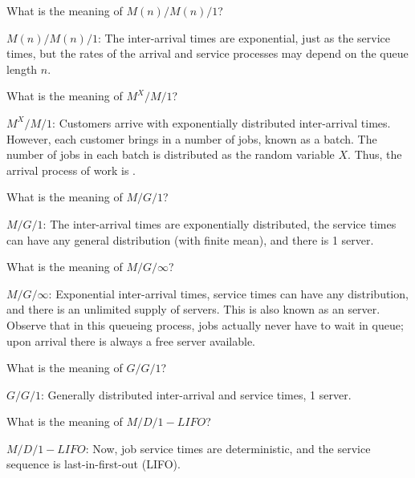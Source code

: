 \begin{exercise}
  What is the meaning of $M(n)/M(n)/1$?
  \begin{solution}
$M(n)/M(n)/1$: The inter-arrival times are exponential, just as
  the service times, but the rates of the arrival and service processes
  may depend on the queue length $n$. 
  \end{solution}
\end{exercise}


\begin{exercise}
  What is the meaning of $M^X/M/1$?
  \begin{solution}
 $M^X/M/1$: Customers arrive with exponentially distributed
  inter-arrival times. However, each customer brings in a number of
  jobs, known as a batch. The number of jobs in each batch is
  distributed as the random variable $X$. Thus, the arrival process of
  work is .
  \end{solution}
\end{exercise}

\begin{exercise}
  What is the meaning of $M/G/1$?
  \begin{solution}
$M/G/1$: The inter-arrival times are exponentially distributed,
  the service times can have any general distribution (with
  finite mean), and there is 1 server.
  \end{solution}
\end{exercise}


\begin{exercise}
  What is the meaning of $M/G/\infty$?
  \begin{solution}
 $M/G/\infty$: Exponential inter-arrival times, service times can
  have any distribution, and there is an unlimited supply of
  servers. This is also known as an  server. Observe
  that in this queueing process, jobs actually never have to wait in
  queue; upon arrival there is always a free server available.
  \end{solution}
\end{exercise}

\begin{exercise}
  What is the meaning of $G/G/1$?
  \begin{solution}
 $G/G/1$: Generally distributed inter-arrival and service times, 1 server.
  \end{solution}
\end{exercise}

\begin{exercise}
  What is the meaning of $M/D/1-LIFO$?
  \begin{solution}
 $M/D/1-LIFO$:  Now, job service times are deterministic, and the service sequence is last-in-first-out (LIFO).
  \end{solution}
\end{exercise}

